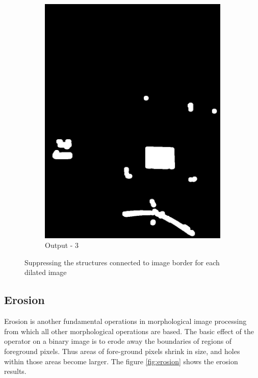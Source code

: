 \documentclass[paper=a4, fontsize=10pt]{scrartcl} %
\numberwithin{equation}{section} %
\numberwithin{figure}{section} %
\begin{document}
\begin{figure}[!ht]
\begin{subfigure}[b]{0.275\textwidth}
		\includegraphics[width=\textwidth]{s_dilation_03}
		\caption{Output - 3}
		\label{fig:s_dilation_output_03}
	\end{subfigure}
	\caption{Suppressing the structures connected to image border for each dilated image}
	\label{fig:s_dilation}
\end{figure}

\subsection{Erosion}
Erosion is another fundamental operations in morphological image processing from which all other morphological operations are based. The basic effect of the operator on a binary image is to erode away the boundaries of regions of foreground pixels. Thus areas of fore-ground pixels shrink in size, and holes within those areas become larger. The figure \ref{fig:erosion} shows the erosion results.
\end{document}
